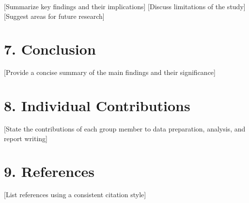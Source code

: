 \documentclass[
]{article}
\begin{document}
{[}Summarize key findings and their implications{]} {[}Discuss
limitations of the study{]} {[}Suggest areas for future research{]}

\hypertarget{conclusion}{%
\section{7. Conclusion}\label{conclusion}}

{[}Provide a concise summary of the main findings and their
significance{]}

\hypertarget{individual-contributions}{%
\section{8. Individual Contributions}\label{individual-contributions}}

{[}State the contributions of each group member to data preparation,
analysis, and report writing{]}

\hypertarget{references}{%
\section{9. References}\label{references}}

{[}List references using a consistent citation style{]}
\end{document}
